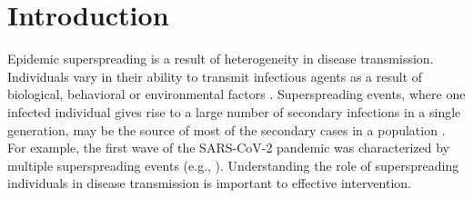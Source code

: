 \documentclass{imammb}
\numberwithin{equation}{section}
\begin{document}
\section{Introduction}
Epidemic superspreading is a result of heterogeneity in disease transmission. Individuals vary in their ability to transmit infectious agents as a result of biological, behavioral or environmental factors \citep{Lloyd-Smith2005-ma,Funk2010-zj, Althouse2020-dn}. Superspreading events, where one infected individual gives rise to a large number of secondary infections in a single generation, may be the source of most of the secondary cases in a population \citep{Althouse2020-dn}. For example, the first wave of the SARS-CoV-2 pandemic was characterized by multiple superspreading events (e.g., \citep{Hamner2020-zt, Adam2020-xk, Lemieux2021-ow, Illingworth2021-rz}). Understanding the role of superspreading individuals in disease transmission is important to effective intervention. 
\end{document}
